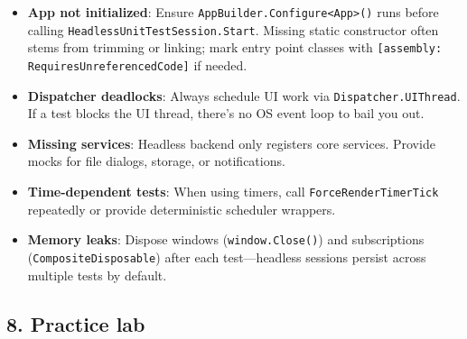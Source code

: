 \begin{itemize}
\tightlist
\item
  \textbf{App not initialized}: Ensure
  \passthrough{\lstinline!AppBuilder.Configure<App>()!} runs before
  calling \passthrough{\lstinline!HeadlessUnitTestSession.Start!}.
  Missing static constructor often stems from trimming or linking; mark
  entry point classes with
  \passthrough{\lstinline![assembly: RequiresUnreferencedCode]!} if
  needed.
\item
  \textbf{Dispatcher deadlocks}: Always schedule UI work via
  \passthrough{\lstinline!Dispatcher.UIThread!}. If a test blocks the UI
  thread, there's no OS event loop to bail you out.
\item
  \textbf{Missing services}: Headless backend only registers core
  services. Provide mocks for file dialogs, storage, or notifications.
\item
  \textbf{Time-dependent tests}: When using timers, call
  \passthrough{\lstinline!ForceRenderTimerTick!} repeatedly or provide
  deterministic scheduler wrappers.
\item
  \textbf{Memory leaks}: Dispose windows
  (\passthrough{\lstinline!window.Close()!}) and subscriptions
  (\passthrough{\lstinline!CompositeDisposable!}) after each
  test---headless sessions persist across multiple tests by default.
\end{itemize}

\subsection{8. Practice lab}\label{practice-lab-5}

